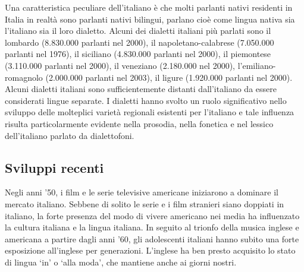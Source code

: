 \documentclass[]{../../metanetpaper}
\begin{document}
\begin{multicols}{2}
Una caratteristica peculiare dell'italiano \`{e} che molti parlanti nativi
residenti in Italia in realt\`{a} sono parlanti nativi bilingui, parlano
cio\`{e} come lingua nativa sia l'italiano sia il loro dialetto. Alcuni dei
dialetti italiani pi\`{u} parlati sono il lombardo (8.830.000 parlanti nel
2000), il napoletano-calabrese (7.050.000 parlanti nel 1976), il siciliano
(4.830.000 parlanti nel 2000), il piemontese (3.110.000 parlanti nel 2000), il
veneziano (2.180.000 nel 2000), l'emiliano-romagnolo (2.000.000 parlanti nel
2003), il ligure (1.920.000 parlanti nel 2000). Alcuni dialetti italiani sono
sufficientemente distanti dall'italiano da essere considerati lingue
separate. I dialetti hanno svolto un ruolo significativo nello sviluppo delle
molteplici variet\`{a} regionali esistenti per l'italiano e tale influenza
risulta particolarmente evidente nella prosodia, nella fonetica e nel lessico
dell'italiano parlato da dialettofoni.

\subsection{Sviluppi recenti}

Negli anni '50, i film e le serie televisive americane iniziarono a dominare
il mercato italiano. Sebbene di solito le serie e i film stranieri siano
doppiati in italiano, la forte presenza del modo di vivere americano nei media
ha influenzato la cultura italiana e la lingua italiana. In seguito al trionfo
della musica inglese e americana a partire dagli anni '60, gli adolescenti
italiani hanno subito una forte esposizione all'inglese per
generazioni. L'inglese ha ben presto acquisito lo stato di lingua `in' o `alla
moda', che mantiene anche ai giorni nostri.


\end{multicols}
\end{document}
